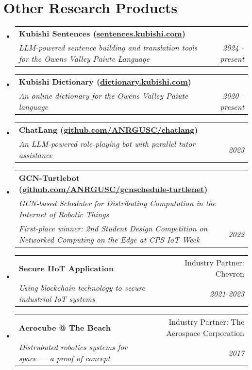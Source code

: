 \documentclass[letterpaper,11pt]{article}
\makeatletter
\newcommand{\resumeSubheading}[4]{
  \vspace{-1pt}\item[]
    \begin{tabular*}{0.97\textwidth}{l@{\extracolsep{\fill}}r}
      \textbf{#1} & #2 \\
      \textit{\small#3} & \textit{\small #4} \\
    \end{tabular*}\vspace{-5pt}
}
\newcommand{\resumeSubheadingTwo}[6]{
  \vspace{-1pt}\item[]
    \begin{tabular*}{0.97\textwidth}{l@{\extracolsep{\fill}}r}
      \textbf{#1} & #2 \\
      \textit{\small#3} & \textit{\small #4} \\
      \textit{\small#5} & \textit{\small #6}
    \end{tabular*}\vspace{-5pt}
}
\newcommand{\resumeSubHeadingListStart}{\begin{itemize}[leftmargin=*]}
\newcommand{\resumeSubHeadingListEnd}{\end{itemize}}
\makeatother
\begin{document}
\section{Other Research Products}
    \resumeSubHeadingListStart
    \resumeSubheading
    {Kubishi Sentences (\href{https://sentences.kubishi.com}{sentences.kubishi.com})}{}
    {LLM-powered sentence building and translation tools for the Owens Valley Paiute Language}{2024 - present}

    \resumeSubheading
    {Kubishi Dictionary (\href{https://dictionary.kubishi.com}{dictionary.kubishi.com})}{}
    {An online dictionary for the Owens Valley Paiute language}{2020 - present}

    \resumeSubheading
    {ChatLang (\href{https://github.com/ANRGUSC/chatlang}{github.com/ANRGUSC/chatlang})}{}
    {An LLM-powered role-playing bot with parallel tutor assistance}{2023}

    \resumeSubheadingTwo
    {GCN-Turtlebot (\href{https://github.com/ANRGUSC/gcnschedule-turtlenet}{github.com/ANRGUSC/gcnschedule-turtlenet})}{}
    {GCN-based Scheduler for Distributing Computation in the Internet of Robotic Things}{}
    {First-place winner: 2nd Student Design Competition on Networked Computing on the Edge at CPS IoT Week}{2022}

    \resumeSubheading
    {Secure IIoT Application}{Industry Partner: Chevron}
    {Using blockchain technology to secure industrial IoT systems}{2021-2023}
    
    \resumeSubheading
    {Aerocube @ The Beach}{Industry Partner: The Aerospace Corporation}
    {Distrubuted robotics systems for space --- a proof of concept}{2017}
\resumeSubHeadingListEnd


% 
% 
\end{document}
